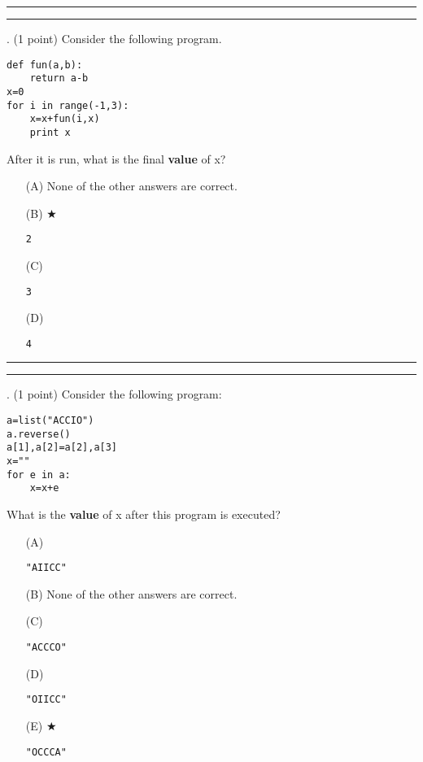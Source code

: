 \documentclass{article}
\begin{document}
\vspace*{2em}
\hrule
\vspace{2em}

\vspace{2em}
\hrule height 2pt


\newpage
{}. (1 point)
Consider the following program.
\begin{verbatim}
def fun(a,b):
    return a-b
x=0
for i in range(-1,3):
    x=x+fun(i,x)
    print x
\end{verbatim}
After it is run, what is the final \textbf{value} of x?


\begin{enumerate}
\item[(A)]
None of the other answers are correct.

\item[(B)] $\bigstar$ 
\begin{verbatim}2\end{verbatim}

\item[(C)]
\begin{verbatim}3\end{verbatim}

\item[(D)]
\begin{verbatim}4\end{verbatim}

\end{enumerate}

\vspace*{2em}
\hrule
\vspace{2em}

\vspace{2em}
\hrule height 2pt


\newpage
{}. (1 point)
Consider the following program:
\begin{verbatim}
a=list("ACCIO")
a.reverse()
a[1],a[2]=a[2],a[3]
x=""
for e in a:
    x=x+e
\end{verbatim}
What is the \textbf{value} of x after this program is executed?


\begin{enumerate}
\item[(A)]
\begin{verbatim}"AIICC"\end{verbatim}

\item[(B)]
None of the other answers are correct.

\item[(C)]
\begin{verbatim}"ACCCO"\end{verbatim}

\item[(D)]
\begin{verbatim}"OIICC"\end{verbatim}

\item[(E)] $\bigstar$ 
\begin{verbatim}"OCCCA"\end{verbatim}

\end{enumerate}
\end{document}
